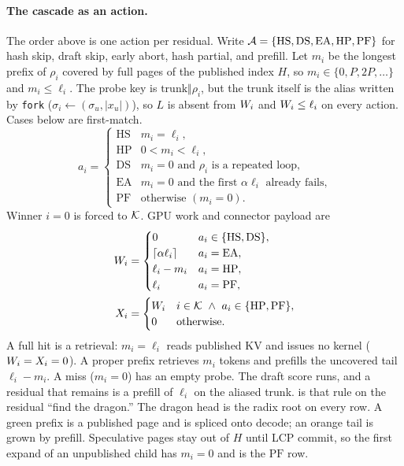 \paragraph{The cascade as an action.}
The order above is one action per residual.
Write $\mathcal{A}=\{\mathrm{HS},\mathrm{DS},\mathrm{EA},\mathrm{HP},\mathrm{PF}\}$
for hash skip, draft skip, early abort, hash partial, and prefill.
Let $m_i$ be the longest prefix of $\rho_i$ covered by full pages of the published index $H$, so $m_i\in\{0,P,2P,\ldots\}$ and $m_i\le\ell_i$.
The probe key is $\mathrm{trunk}\Vert\rho_i$, but the trunk itself is the alias written by \texttt{fork} ($\sigma_i\leftarrow(\sigma_u,|x_u|)$), so $L$ is absent from $W_i$ and $W_i\le\ell_i$ on every action.
Cases below are first-match.
\begin{equation}
\label{eq:action}
a_i=\begin{cases}
\mathrm{HS} & m_i=\ell_i,\\
\mathrm{HP} & 0<m_i<\ell_i,\\
\mathrm{DS} & m_i=0\text{ and }\rho_i\text{ is a repeated loop,}\\
\mathrm{EA} & m_i=0\text{ and the first }\alpha\ell_i\text{ already fails,}\\
\mathrm{PF} & \text{otherwise }(m_i=0).
\end{cases}
\end{equation}
Winner $i{=}0$ is forced to $\mathcal{K}$.
GPU work and connector payload are
\begin{align}
W_i &=
\begin{cases}
0 & a_i\in\{\mathrm{HS},\mathrm{DS}\},\\
\lceil\alpha\ell_i\rceil & a_i=\mathrm{EA},\\
\ell_i-m_i & a_i=\mathrm{HP},\\
\ell_i & a_i=\mathrm{PF},
\end{cases}
\label{eq:work}\\
X_i &=
\begin{cases}
W_i & i\in\mathcal{K}\ \wedge\ a_i\in\{\mathrm{HP},\mathrm{PF}\},\\
0 & \text{otherwise.}
\end{cases}
\label{eq:xfer}
\end{align}
A full hit is a retrieval: $m_i=\ell_i$ reads published KV and issues no kernel ($W_i=X_i=0$).
A proper prefix retrieves $m_i$ tokens and prefills the uncovered tail $\ell_i-m_i$.
A miss ($m_i=0$) has an empty probe. The draft score runs, and a residual that remains is a prefill of $\ell_i$ on the aliased trunk.
 is that rule on the residual ``find the dragon.''
The dragon head is the radix root on every row.
A green prefix is a published page and is spliced onto decode; an orange tail is grown by prefill.
Speculative pages stay out of $H$ until LCP commit, so the first expand of an unpublished child has $m_i=0$ and is the $\mathrm{PF}$ row.

